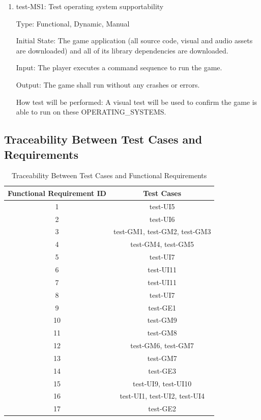 \documentclass[12pt, titlepage]{article}
\begin{document}
\begin{enumerate}
\item{test-MS1: Test operating system supportability\\}

Type: Functional, Dynamic, Manual
					
Initial State: The game application (all source code, visual and audio assets are downloaded) and all of its library dependencies are downloaded.

Input: The player executes a command sequence to run the game.
					
Output: The game shall run without any crashes or errors.
					
How test will be performed: A visual test will be used to confirm the game is able to run on these OPERATING\_SYSTEMS. 
 
\end{enumerate}

\subsection{Traceability Between Test Cases and Requirements}
\begin{table}[H]
  \begin{center}
    \caption{Traceability Between Test Cases and Functional Requirements }
    \label{tab:table1}
    \begin{tabular}{c|c} 
        \toprule
        \textbf{Functional Requirement ID} & \textbf{Test Cases}\\
        \midrule
        1 & test-UI5\\
        \hline
        2 & test-UI6\\
        \hline
        3 & test-GM1, test-GM2, test-GM3 \\
        \hline
        4 & test-GM4, test-GM5\\
        \hline
        5 & test-UI7\\
        \hline
        6 & test-UI11\\
        \hline
        7 &  test-UI11\\
        \hline
        8 & test-UI7\\
        \hline
        9 & test-GE1\\
        \hline
        10 & test-GM9 \\
        \hline
        11 & test-GM8\\
        \hline
        12 & test-GM6, test-GM7\\
        \hline
        13 & test-GM7\\
        \hline
        14 & test-GE3\\
        \hline
        15 & test-UI9, test-UI10\\
        \hline
        16 & test-UI1, test-UI2, test-UI4\\
        \hline
        17 & test-GE2\\
        \bottomrule
    \end{tabular}
  \end{center}
\end{table}
\end{document}
